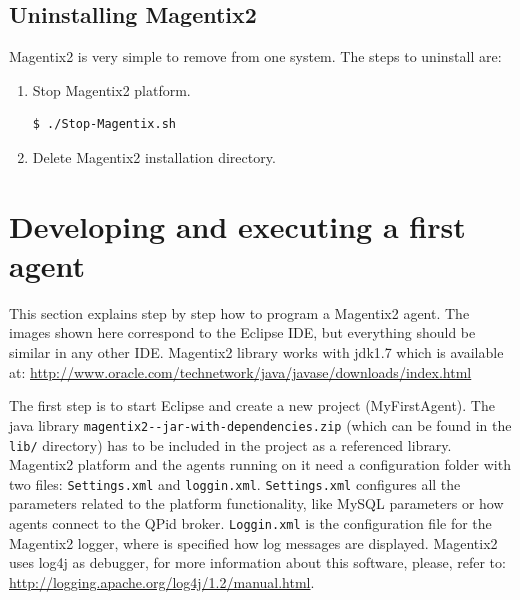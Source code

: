 \subsection{Uninstalling Magentix2}

Magentix2 is very simple to remove from one system. The steps to uninstall are:
\begin{enumerate}
\item Stop Magentix2 platform.
\begin{verbatim}
$ ./Stop-Magentix.sh
\end{verbatim}
\item Delete Magentix2 installation directory.
\end{enumerate}


\section{Developing and executing a first agent}\label{sec:devel1stAgent}
This section explains step by step how to program a Magentix2 agent. The images shown here correspond to the Eclipse IDE, but everything should be similar in any other IDE. Magentix2 library works with jdk1.7 which is available at: \url{http://www.oracle.com/technetwork/java/javase/downloads/index.html}

The first step is to start Eclipse and create a new project (MyFirstAgent). The java library \texttt{magentix2-\MagentixVersion-jar-with-dependencies.zip} (which can be found in the \texttt{lib/} directory) has to be included in the project as a referenced library. Magentix2 platform and the agents running on it need a configuration folder with two files: \texttt{Settings.xml} and \texttt{loggin.xml}. \texttt{Settings.xml} configures all the parameters related to the platform functionality, like MySQL parameters or how agents connect to the QPid broker. \texttt{Loggin.xml} is the configuration file for the Magentix2 logger, where is specified how log messages are displayed. Magentix2 uses log4j as debugger, for more information about this software, please, refer to: \url{http://logging.apache.org/log4j/1.2/manual.html}. 

